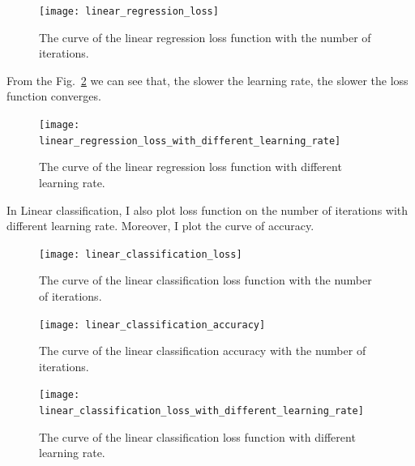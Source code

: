 \documentclass[journal, a4paper]{IEEEtran}
\begin{document}
\begin{figure}[!hbt]
    \begin{center}
    \texttt{[image: linear\_regression\_loss]}
    \caption{The curve of the linear regression loss function with the number of iterations.}
    \label{fig:linear_regression_loss}
    \end{center}
\end{figure}

From the Fig.~\ref{fig:linear_regression_loss_with_different_learning_rate} we can see that, the slower the learning rate, the slower the loss function converges.

\begin{figure}[!hbt]
    \begin{center}
    \texttt{[image: linear\_regression\_loss\_with\_different\_learning\_rate]}
    \caption{The curve of the linear regression loss function with different learning rate.}
    \label{fig:linear_regression_loss_with_different_learning_rate}
    \end{center}
\end{figure}

In Linear classification, I also plot loss function on the number of iterations with different learning rate.
Moreover, I plot the curve of accuracy.

\begin{figure}[!hbt]
    \begin{center}
    \texttt{[image: linear\_classification\_loss]}
    \caption{The curve of the linear classification loss function with the number of iterations.}
    \label{fig:linear_classification_loss}
    \end{center}
\end{figure}

\begin{figure}[!hbt]
    \begin{center}
    \texttt{[image: linear\_classification\_accuracy]}
    \caption{The curve of the linear classification accuracy with the number of iterations.}
    \label{fig:linear_classification_accuracy}
    \end{center}
\end{figure}

\begin{figure}[!hbt]
    \begin{center}
    \texttt{[image: linear\_classification\_loss\_with\_different\_learning\_rate]}
    \caption{The curve of the linear classification loss function with different learning rate.}
    \label{fig:linear_classification_loss_with_different_learning_rate}
    \end{center}
\end{figure}
\end{document}
